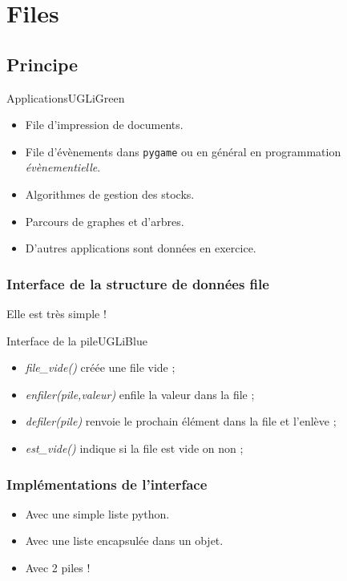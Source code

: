 \documentclass[10pt,firamath,cours]{nsi}
\begin{document}
\chapter{Files}
\section{Principe}

\begin{encadrecolore}{Applications}{UGLiGreen}
	\begin{itemize}
		\item 	File d'impression de documents.
		\item 	File d'évènements dans \texttt{pygame} ou en général en programmation \textit{évènementielle}.
		\item	Algorithmes de gestion des stocks.
		\item 	Parcours de graphes et d'arbres.
		\item 	D'autres applications sont données en exercice.
	\end{itemize}
\end{encadrecolore}

\subsection{Interface de la structure de données file}
Elle est très simple !
\begin{encadrecolore}{Interface de la pile}{UGLiBlue}
	\begin{itemize}
		\item \textit{file\_vide()} créée une file vide ;
		\item \textit{enfiler(pile,valeur)} enfile la valeur dans la file ;
		\item  \textit{defiler(pile)} renvoie le prochain élément dans la file et l'enlève ;
		\item \textit{est\_vide()} indique si la file est vide on non ;
	\end{itemize}
\end{encadrecolore}

\subsection{Implémentations de l'interface}
	\begin{itemize}
		\item Avec une simple liste python.
		\item Avec une liste encapsulée dans un objet.
		\item Avec 2 piles !
	\end{itemize}
\end{document}
